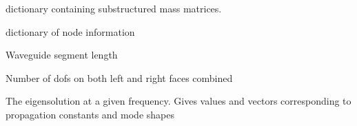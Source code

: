 \documentclass[letterpaper,10pt,english]{sphinxmanual}
\begin{document}
\begin{fulllineitems}
\begin{fulllineitems}
\end{fulllineitems}


\begin{fulllineitems}
\label{\detokenize{model:pywfe.Model.M_sub}}
\pysigstartsignatures
{}
\pysigstopsignatures
\sphinxAtStartPar
dictionary containing substructured mass matrices.

\end{fulllineitems}


\begin{fulllineitems}
\label{\detokenize{model:pywfe.Model.node}}
\pysigstartsignatures
{}
\pysigstopsignatures
\sphinxAtStartPar
dictionary of node information

\end{fulllineitems}


\begin{fulllineitems}
\label{\detokenize{model:pywfe.Model.delta}}
\pysigstartsignatures
{}
\pysigstopsignatures
\sphinxAtStartPar
Waveguide segment length

\end{fulllineitems}


\begin{fulllineitems}
\label{\detokenize{model:pywfe.Model.N}}
\pysigstartsignatures
{}
\pysigstopsignatures
\sphinxAtStartPar
Number of dofs on both left and right faces combined

\end{fulllineitems}


\begin{fulllineitems}
\label{\detokenize{model:pywfe.Model.eigensolution}}
\pysigstartsignatures
{}
\pysigstopsignatures
\sphinxAtStartPar
The eigensolution at a given frequency. Gives values and vectors corresponding to propagation constants and mode shapes


\end{fulllineitems}
\end{fulllineitems}
\end{document}

